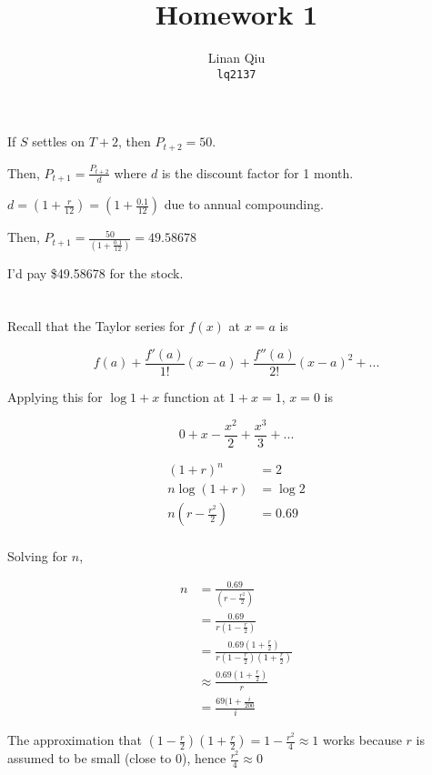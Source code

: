 \documentclass[11pt]{scrartcl}
\title{Homework 1}
\author{Linan Qiu\\\texttt{lq2137}}
\begin{document}
\maketitle

\section{}

If $S$ settles on $T+2$, then $P_{t+2} = 50$.

Then, $P_{t+1} = \frac{P_{t+2}}{d}$ where $d$ is the discount factor for 1 month.

$d = \left(1+\frac{r}{12}\right) = \left(1+\frac{0.1}{12}\right)$ due to annual compounding.

Then, $P_{t+1} = \frac{50}{\left(1+\frac{0.1}{12}\right)} = 49.58678$

I'd pay \$49.58678 for the stock.

\section{}

Recall that the Taylor series for $f(x)$ at $x = a$ is

\[f(a) + \frac{f'(a)}{1!}(x-a) + \frac{f''(a)}{2!}(x-a)^2 + ... \]

Applying this for $\log{1+x}$ function at $1 + x = 1$, $x = 0$ is

\[0 + x - \frac{x^2}{2} + \frac{x^3}{3} + ...\]

\begin{align*}
(1+r)^n &= 2 \\
n \log{(1+r)} &= \log 2 \\
n \left(r - \frac{r^2}{2}\right) &= 0.69 \\
\end{align*}

Solving for $n$,

\begin{align*}
n &= \frac{0.69}{\left(r - \frac{r^2}{2}\right)} \\
&= \frac{0.69}{r\left(1 - \frac{r}{2} \right)} \\
&= \frac{0.69\left(1 + \frac{r}{2}\right)}{r \left(1 - \frac{r}{2}\right) \left(1 + \frac{r}{2}\right)} \\
&\approx \frac{0.69\left(1+\frac{r}{2}\right)}{r} \\
&= \frac{69(1+\frac{i}{200}}{i}
\end{align*}

The approximation that $\left(1-\frac{r}{2}\right)\left(1+\frac{r}{2}\right) = 1 - \frac{r^2}{4} \approx 1$ works because $r$ is assumed to be small (close to 0), hence $\frac{r^2}{4} \approx 0$
\end{document}
